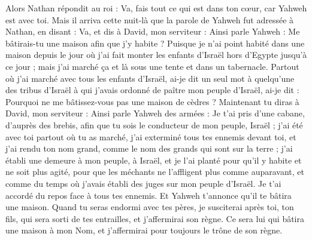 \begin{multicols}{2}
Alors Nathan répondit au roi : Va, fais tout ce qui est dans ton cœur, car Yahweh est avec toi.
Mais il arriva cette nuit-là que la parole de Yahweh fut adressée à Nathan, en disant :
Va, et dis à David, mon serviteur : Ainsi parle Yahweh : Me bâtirais-tu une maison afin que j’y habite ?
Puisque je n'ai point habité dans une maison depuis le jour où j'ai fait monter les enfants d'Israël hors d'Egypte jusqu'à ce jour ; mais j'ai marché ça et là sous une tente et dans un tabernacle.
Partout où j'ai marché avec tous les enfants d'Israël, ai-je dit un seul mot à quelqu'une des tribus d'Israël à qui j’avais ordonné de paître mon peuple d'Israël, ai-je dit : Pourquoi ne me bâtissez-vous pas une maison de cèdres ?
Maintenant tu diras à David, mon serviteur : Ainsi parle Yahweh des armées : Je t'ai pris d’une cabane, d’auprès des brebis, afin que tu sois le conducteur de mon peuple, Israël ;
j'ai été avec toi partout où tu as marché, j'ai exterminé tous tes ennemis devant toi, et j'ai rendu ton nom grand, comme le nom des grands qui sont sur la terre ;
j’ai établi une demeure à mon peuple, à Israël, et je l’ai planté pour qu'il y habite et ne soit plus agité, pour que les méchants ne l’affligent plus comme auparavant,
et comme du temps où j'avais établi des juges sur mon peuple d'Israël. Je t'ai accordé du repos face à tous tes ennemis. Et Yahweh t'annonce qu'il te bâtira une maison.
Quand tu seras endormi avec tes pères, je susciterai après toi, ton fils, qui sera sorti de tes entrailles, et j'affermirai son règne.
Ce sera lui qui bâtira une maison à mon Nom, et j'affermirai pour toujours le trône de son règne.

\end{multicols}
